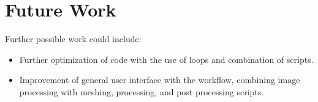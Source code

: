 \documentclass[report.tex]{subfiles}
\begin{document}
\section{Future Work}
Further possible work could include:

\begin{itemize}
  \item Further optimization of code with the use of loops and combination of scripts.
  \item Improvement of general user interface with the workflow, combining image processing with meshing, processing, and post processing scripts.
\end{itemize}
\end{document}
